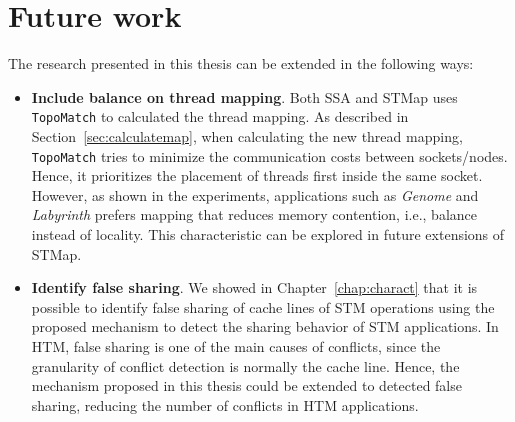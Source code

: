 \section{Future work}

The research presented in this thesis can be extended in the following ways:

\begin{itemize}
	\item \textbf{Include balance on thread mapping}. Both SSA and STMap uses \texttt{TopoMatch} to calculated the thread mapping. As described in Section~\ref{sec:calculatemap}, when calculating the new thread mapping, \texttt{TopoMatch} tries to minimize the communication costs between sockets/nodes. Hence, it prioritizes the placement of threads first inside the same socket. However, as shown in the experiments, applications such as \emph{Genome} and \emph{Labyrinth} prefers mapping that reduces memory contention, i.e., balance instead of locality. This characteristic can be explored in future extensions of STMap.
	
	\item \textbf{Identify false sharing}. We showed in Chapter~\ref{chap:charact} that it is possible to identify false sharing of cache lines of STM operations using the proposed mechanism to detect the sharing behavior of STM applications. In HTM, false sharing is one of the main causes of conflicts, since the granularity of conflict detection is normally the cache line. Hence, the mechanism proposed in this thesis could be extended to detected false sharing, reducing the number of conflicts in HTM applications.
\end{itemize}